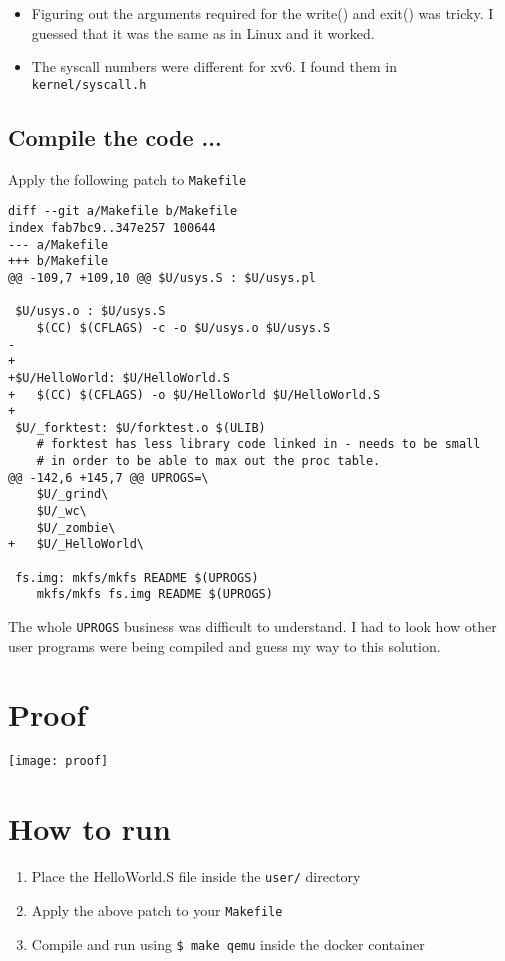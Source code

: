 \documentclass{article}
\begin{document}
\begin{itemize}
	\item Figuring out the arguments required for the write() and exit() was tricky. I guessed that
		it was the same as in Linux and it worked.
	\item The syscall numbers were different for xv6. I found them in \texttt{kernel/syscall.h}
\end{itemize}

\pagebreak

\subsection{Compile the code ...}
Apply the following patch to \texttt{Makefile}

\begin{verbatim}
diff --git a/Makefile b/Makefile
index fab7bc9..347e257 100644
--- a/Makefile
+++ b/Makefile
@@ -109,7 +109,10 @@ $U/usys.S : $U/usys.pl
 
 $U/usys.o : $U/usys.S
 	$(CC) $(CFLAGS) -c -o $U/usys.o $U/usys.S
-
+	
+$U/HelloWorld: $U/HelloWorld.S
+	$(CC) $(CFLAGS) -o $U/HelloWorld $U/HelloWorld.S
+	
 $U/_forktest: $U/forktest.o $(ULIB)
 	# forktest has less library code linked in - needs to be small
 	# in order to be able to max out the proc table.
@@ -142,6 +145,7 @@ UPROGS=\
 	$U/_grind\
 	$U/_wc\
 	$U/_zombie\
+	$U/_HelloWorld\
 
 fs.img: mkfs/mkfs README $(UPROGS)
 	mkfs/mkfs fs.img README $(UPROGS)
\end{verbatim}

The whole \texttt{UPROGS} business was difficult to understand. I had to look how other user programs were being compiled and guess my way to this solution.

\section*{Proof}

\texttt{[image: proof]}

\section*{How to run}
\begin{enumerate}
	\item Place the HelloWorld.S file inside the \texttt{user/} directory
	\item Apply the above patch to your \texttt{Makefile}
	\item Compile and run using \texttt{\$ make qemu} inside the docker container
\end{enumerate}
\end{document}
